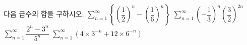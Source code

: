 다음 급수의 합을 구하시오.
 $\displaystyle\sum_{n=1}^{\infty}\left\{\left(\dfrac{1}{2}\right)^{n}-\left(\dfrac{1}{6}\right)^{n}\right\}$
 $\displaystyle\sum_{n=1}^{\infty}\left(-\dfrac{1}{3}\right)^{n}\left(\dfrac{3}{2}\right)^{2n}$
 $\displaystyle\sum_{n=1}^{\infty}\dfrac{2^{n}-3^{n}}{5^{n}}$
 $\displaystyle\sum_{n=1}^{\infty}(4\times 3^{-n}+12\times 6^{-n})$
